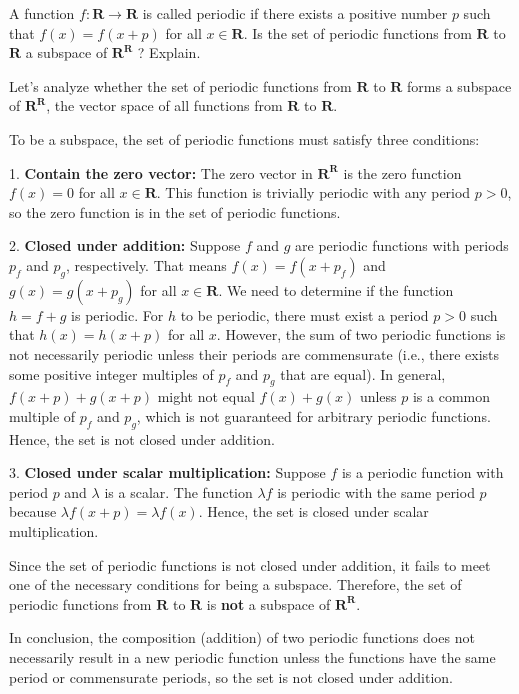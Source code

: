 \begin{exercise}
    A function $f: \mathbf{R} \rightarrow \mathbf{R}$ is called periodic if there exists a positive number $p$ such that $f(x)=f(x+p)$ for all $x \in \mathbf{R}$. Is the set of periodic functions from $\mathbf{R}$ to $\mathbf{R}$ a subspace of $\mathbf{R}^{\mathbf{R}}$ ? Explain.
\end{exercise}
\begin{solution}
Let's analyze whether the set of periodic functions from \(\mathbf{R}\) to \(\mathbf{R}\) forms a subspace of \(\mathbf{R}^{\mathbf{R}} \), the vector space of all functions from \(\mathbf{R}\) to \(\mathbf{R}\).

To be a subspace, the set of periodic functions must satisfy three conditions:

1. \textbf{Contain the zero vector:} The zero vector in \(\mathbf{R}^{\mathbf{R}}\) is the zero function \(f(x) = 0\) for all \(x \in \mathbf{R}\). This function is trivially periodic with any period \(p > 0\), so the zero function is in the set of periodic functions.

2. \textbf{Closed under addition:} Suppose \(f\) and \(g\) are periodic functions with periods \(p_f\) and \(p_g\), respectively. That means \(f(x) = f(x + p_f)\) and \(g(x) = g(x + p_g)\) for all \(x \in \mathbf{R}\). We need to determine if the function \(h = f + g\) is periodic. For \(h\) to be periodic, there must exist a period \(p > 0\) such that \(h(x) = h(x + p)\) for all \(x\). However, the sum of two periodic functions is not necessarily periodic unless their periods are commensurate (i.e., there exists some positive integer multiples of \(p_f\) and \(p_g\) that are equal). In general, \(f(x + p) + g(x + p)\) might not equal \(f(x) + g(x)\) unless \(p\) is a common multiple of \(p_f\) and \(p_g\), which is not guaranteed for arbitrary periodic functions. Hence, the set is not closed under addition.

3. \textbf{Closed under scalar multiplication:} Suppose \(f\) is a periodic function with period \(p\) and \(\lambda\) is a scalar. The function \(\lambda f\) is periodic with the same period \(p\) because \(\lambda f(x + p) = \lambda f(x)\). Hence, the set is closed under scalar multiplication.

Since the set of periodic functions is not closed under addition, it fails to meet one of the necessary conditions for being a subspace. Therefore, the set of periodic functions from \(\mathbf{R}\) to \(\mathbf{R}\) is \textbf{not} a subspace of \(\mathbf{R}^{\mathbf{R}}\).

In conclusion, the composition (addition) of two periodic functions does not necessarily result in a new periodic function unless the functions have the same period or commensurate periods, so the set is not closed under addition.
\end{solution}
